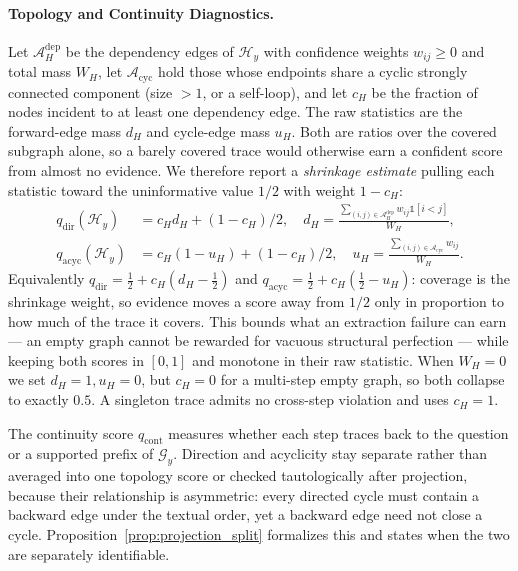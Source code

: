 \paragraph{Topology and Continuity Diagnostics.}
\label{sec:diagnostics}
Let $\mathcal{A}_H^{\mathrm{dep}}$ be the dependency edges of $\mathcal{H}_y$ with confidence weights $w_{ij}\geq0$ and total mass $W_H$, let $\mathcal{A}_{\mathrm{cyc}}$ hold those whose endpoints share a cyclic strongly connected component (size $>1$, or a self-loop), and let $c_H$ be the fraction of nodes incident to at least one dependency edge. The raw statistics are the forward-edge mass $d_H$ and cycle-edge mass $u_H$. Both are ratios over the covered subgraph alone, so a barely covered trace would otherwise earn a confident score from almost no evidence. We therefore report a \emph{shrinkage estimate} pulling each statistic toward the uninformative value $1/2$ with weight $1-c_H$:
\begin{align}
q_{\mathrm{dir}}(\mathcal{H}_y)
&=c_H d_H+(1-c_H)/2, \quad
d_H=\frac{\sum_{(i,j)\in\mathcal{A}_H^{\mathrm{dep}}}w_{ij}\mathbb{1}[i<j]}
{W_H}, \label{eq:qdir}\\
q_{\mathrm{acyc}}(\mathcal{H}_y)
&=c_H(1-u_H)+(1-c_H)/2, \quad
u_H=\frac{\sum_{(i,j)\in\mathcal{A}_{\mathrm{cyc}}}w_{ij}}
{W_H}. \label{eq:qacyc}
\end{align}
Equivalently $q_{\mathrm{dir}}=\tfrac12+c_H(d_H-\tfrac12)$ and $q_{\mathrm{acyc}}=\tfrac12+c_H(\tfrac12-u_H)$: coverage is the shrinkage weight, so evidence moves a score away from $1/2$ only in proportion to how much of the trace it covers. This bounds what an extraction failure can earn --- an empty graph cannot be rewarded for vacuous structural perfection --- while keeping both scores in $[0,1]$ and monotone in their raw statistic. When $W_H=0$ we set $d_H=1,u_H=0$, but $c_H=0$ for a multi-step empty graph, so both collapse to exactly $0.5$. A singleton trace admits no cross-step violation and uses $c_H=1$.

The continuity score $q_{\mathrm{cont}}$ measures whether each step traces back to the question or a supported prefix of $\mathcal{G}_y$. Direction and acyclicity stay separate rather than averaged into one topology score or checked tautologically after projection, because their relationship is asymmetric: every directed cycle must contain a backward edge under the textual order, yet a backward edge need not close a cycle. Proposition~\ref{prop:projection_split} formalizes this and states when the two are separately identifiable.

